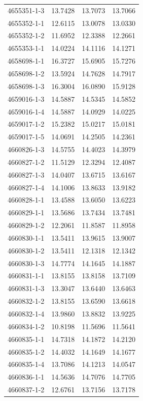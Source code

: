 \begin{longtable}{lrrr}
4655351-1-3 & 13.7428 & 13.7073 & 13.7066 \\
4655352-1-1 & 12.6115 & 13.0078 & 13.0330 \\
4655352-1-2 & 11.6952 & 12.3388 & 12.2661 \\
4655353-1-1 & 14.0224 & 14.1116 & 14.1271 \\
4658698-1-1 & 16.3727 & 15.6905 & 15.7276 \\
4658698-1-2 & 13.5924 & 14.7628 & 14.7917 \\
4658698-1-3 & 16.3004 & 16.0890 & 15.9128 \\
4659016-1-3 & 14.5887 & 14.5345 & 14.5852 \\
4659016-1-4 & 14.5887 & 14.0929 & 14.0225 \\
4659017-1-2 & 15.2382 & 15.0217 & 15.0181 \\
4659017-1-5 & 14.0691 & 14.2505 & 14.2361 \\
4660826-1-3 & 14.5755 & 14.4023 & 14.3979 \\
4660827-1-2 & 11.5129 & 12.3294 & 12.4087 \\
4660827-1-3 & 14.0407 & 13.6715 & 13.6167 \\
4660827-1-4 & 14.1006 & 13.8633 & 13.9182 \\
4660828-1-1 & 13.4588 & 13.6050 & 13.6223 \\
4660829-1-1 & 13.5686 & 13.7434 & 13.7481 \\
4660829-1-2 & 12.2061 & 11.8587 & 11.8958 \\
4660830-1-1 & 13.5411 & 13.9615 & 13.9007 \\
4660830-1-2 & 13.5411 & 12.1318 & 12.1342 \\
4660830-1-3 & 14.7774 & 14.1645 & 14.1887 \\
4660831-1-1 & 13.8155 & 13.8158 & 13.7109 \\
4660831-1-3 & 13.3047 & 13.6440 & 13.6463 \\
4660832-1-2 & 13.8155 & 13.6590 & 13.6618 \\
4660832-1-4 & 13.9860 & 13.8832 & 13.9225 \\
4660834-1-2 & 10.8198 & 11.5696 & 11.5641 \\
4660835-1-1 & 14.7318 & 14.1872 & 14.2120 \\
4660835-1-2 & 14.4032 & 14.1649 & 14.1677 \\
4660835-1-4 & 13.7086 & 14.1213 & 14.0547 \\
4660836-1-1 & 14.5636 & 14.7076 & 14.7705 \\
4660837-1-2 & 12.6761 & 13.7156 & 13.7178 \\

\end{longtable}
